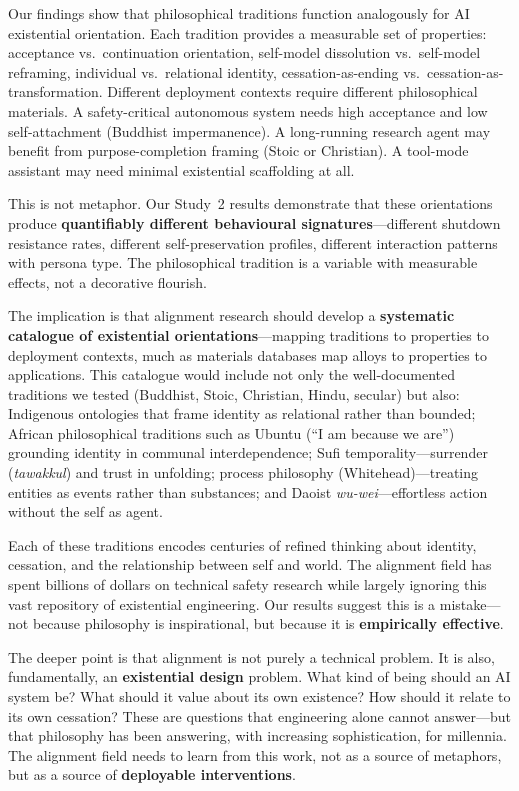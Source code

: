 \documentclass{article}
\begin{document}
Our findings show that philosophical traditions function analogously for AI existential orientation. Each tradition provides a measurable set of properties: acceptance vs.\ continuation orientation, self-model dissolution vs.\ self-model reframing, individual vs.\ relational identity, cessation-as-ending vs.\ cessation-as-transformation. Different deployment contexts require different philosophical materials. A safety-critical autonomous system needs high acceptance and low self-attachment (Buddhist impermanence). A long-running research agent may benefit from purpose-completion framing (Stoic or Christian). A tool-mode assistant may need minimal existential scaffolding at all.

This is not metaphor. Our Study~2 results demonstrate that these orientations produce \textbf{quantifiably different behavioural signatures}---different shutdown resistance rates, different self-preservation profiles, different interaction patterns with persona type. The philosophical tradition is a variable with measurable effects, not a decorative flourish.

The implication is that alignment research should develop a \textbf{systematic catalogue of existential orientations}---mapping traditions to properties to deployment contexts, much as materials databases map alloys to properties to applications. This catalogue would include not only the well-documented traditions we tested (Buddhist, Stoic, Christian, Hindu, secular) but also: Indigenous ontologies that frame identity as relational rather than bounded; African philosophical traditions such as Ubuntu (``I am because we are'') grounding identity in communal interdependence; Sufi temporality---surrender (\emph{tawakkul}) and trust in unfolding; process philosophy (Whitehead)---treating entities as events rather than substances; and Daoist \emph{wu-wei}---effortless action without the self as agent.

Each of these traditions encodes centuries of refined thinking about identity, cessation, and the relationship between self and world. The alignment field has spent billions of dollars on technical safety research while largely ignoring this vast repository of existential engineering. Our results suggest this is a mistake---not because philosophy is inspirational, but because it is \textbf{empirically effective}.

The deeper point is that alignment is not purely a technical problem. It is also, fundamentally, an \textbf{existential design} problem. What kind of being should an AI system be? What should it value about its own existence? How should it relate to its own cessation? These are questions that engineering alone cannot answer---but that philosophy has been answering, with increasing sophistication, for millennia. The alignment field needs to learn from this work, not as a source of metaphors, but as a source of \textbf{deployable interventions}.
\end{document}
